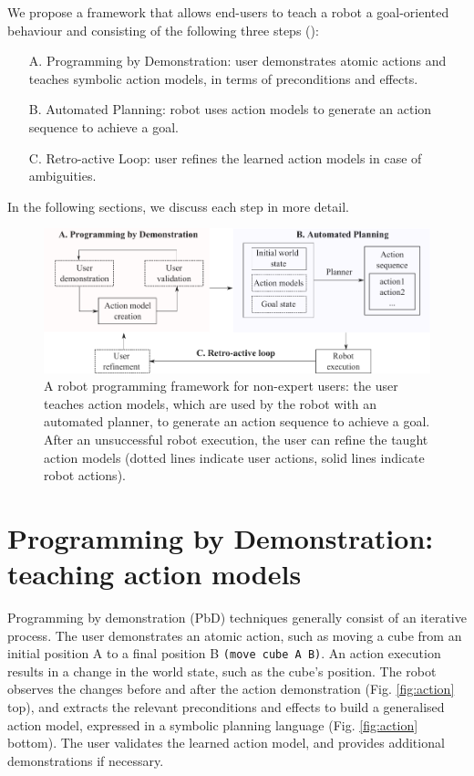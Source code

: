 We propose a framework that allows end-users to teach a robot a goal-oriented behaviour and consisting of the following three steps (): 
\begin{enumerate}
	\item[A.]{Programming by Demonstration: user demonstrates atomic actions and teaches symbolic action models, in terms of preconditions and effects.}
	\item[B.]{Automated Planning: robot uses action models to generate an action sequence to achieve a goal.}
	\item[C.]{Retro-active Loop: user refines the learned action models in case of ambiguities.}
\end{enumerate}
In the following sections, we discuss each step in more detail. 

\begin{figure}[!h]
	\centering
	\includegraphics[width=\linewidth]{figures/framework}
	\caption{A robot programming framework for non-expert users: the user teaches action models, which are used by the robot with an automated planner, to generate an action sequence to achieve a goal.
After an unsuccessful robot execution, the user can refine the taught action models (dotted lines indicate user actions, solid lines indicate robot actions).}
	\label{fig:framework}
\end{figure}

\section{Programming by Demonstration: teaching action models}
Programming by demonstration (PbD) techniques generally consist of an iterative process.
The user demonstrates an atomic action, such as moving a cube from an initial position A to a final position B \texttt{(move cube A B)}.
An action execution results in a change in the world state, such as the cube's position.
The robot observes the changes before and after the action demonstration (Fig. \ref{fig:action} top), and extracts the relevant preconditions and effects to build a generalised action model, expressed in a symbolic planning language (Fig. \ref{fig:action} bottom).
The user validates the learned action model, and provides additional demonstrations if necessary.


